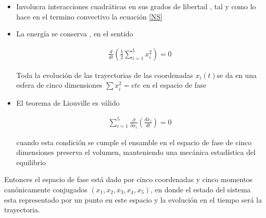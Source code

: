 \begin{itemize}
    \item Involucra interacciones cuadráticas en sus grados de libertad , tal y como lo hace en el termino convectivo la ecuación \eqref{NS}
    
    \item La energía se conserva , en el sentido 
    
    \begin{eqnarray}
    \frac{d}{dt}\left(\frac{1}{2}\sum_{i=1}^{5}x_{i}^{2}\right) = 0
    \end{eqnarray}
    
    Toda la evolución de las trayectorias de las coordenadas $x_{i}(t)$se da en una esfera de cinco dimensiones $\sum x_{i}^{2}=cte$ en el espacio de fase
    
    \item El teorema de Liouville es válido
    
    \begin{eqnarray}
    \sum_{i=1}^{5}\frac{\partial}{\partial x_{i}}\left(\frac{dx_{i}}{dt}\right) = 0
    \end{eqnarray}
    
    cuando esta condición se cumple el ensamble en el espacio de fase de cinco dimensiones preserva el volumen, manteniendo una mecánica estadística del equilibrio
    
\end{itemize}


\noindent Entonces el espacio de fase está dado por cinco coordenadas y cinco momentos canónicamente conjugados $(x_{1},x_{2},x_{3},x_{4},x_{5})$, en donde el estado del sistema esta representado por un punto en este espacio y la evolución en el tiempo será la trayectoria. 

